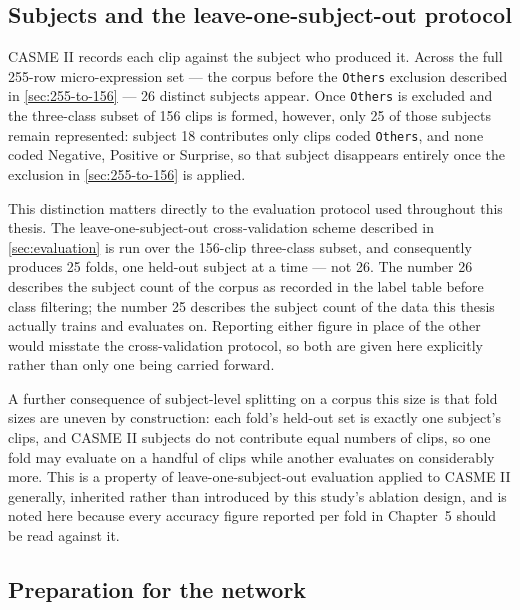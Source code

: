 \subsection{Subjects and the leave-one-subject-out protocol}
\label{sec:subjects-loso}

CASME II records each clip against the subject who produced it. Across the full 255-row micro-expression set --- the corpus before the \texttt{Others} exclusion described in \autoref{sec:255-to-156} --- 26 distinct subjects appear. Once \texttt{Others} is excluded and the three-class subset of 156 clips is formed, however, only 25 of those subjects remain represented: subject 18 contributes only clips coded \texttt{Others}, and none coded Negative, Positive or Surprise, so that subject disappears entirely once the exclusion in \autoref{sec:255-to-156} is applied.

This distinction matters directly to the evaluation protocol used throughout this thesis. The leave-one-subject-out cross-validation scheme described in \autoref{sec:evaluation} is run over the 156-clip three-class subset, and consequently produces 25 folds, one held-out subject at a time --- not 26. The number 26 describes the subject count of the corpus as recorded in the label table before class filtering; the number 25 describes the subject count of the data this thesis actually trains and evaluates on. Reporting either figure in place of the other would misstate the cross-validation protocol, so both are given here explicitly rather than only one being carried forward.

A further consequence of subject-level splitting on a corpus this size is that fold sizes are uneven by construction: each fold's held-out set is exactly one subject's clips, and CASME II subjects do not contribute equal numbers of clips, so one fold may evaluate on a handful of clips while another evaluates on considerably more. This is a property of leave-one-subject-out evaluation applied to CASME II generally, inherited rather than introduced by this study's ablation design, and is noted here because every accuracy figure reported per fold in Chapter~5 should be read against it.

\subsection{Preparation for the network}
\label{sec:network-preparation}

